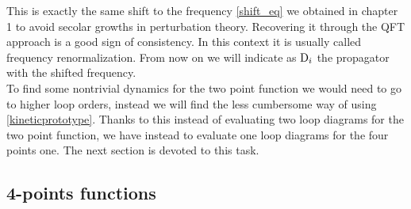 This is exactly the same shift to the frequency \eqref{shift_eq} we obtained in chapter 1 to avoid secolar growths in perturbation theory.
Recovering it through the QFT approach is a good sign of consistency. In this context it is usually called frequency renormalization. From now on we will indicate
as $\mathrm{D}_i$ the propagator with the shifted frequency.\\  
To find some nontrivial dynamics for the two point function we would need to go to higher loop orders, instead we will find the less cumbersome way of using 
\eqref{kineticprototype}. Thanks to this instead of evaluating two loop diagrams for the two point function, we have instead to evaluate one loop diagrams for the 
four points one. The next section is devoted to this task.\\  
\subsection{4-points functions}

